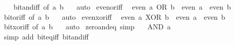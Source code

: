 \begin{isabellebody}
%
\isadelimproof
\ \ %
\endisadelimproof
%
\isatagproof
{}\isamarkupfalse%
\ bit{\isacharunderscore}{\kern0pt}and{\isacharunderscore}{\kern0pt}iff\ {\isacharbrackleft}{\kern0pt}of\ a\ b\ {}{\isacharbrackright}{\kern0pt}\ \isamarkupfalse%
\ auto%
\endisatagproof
{\isafoldproof}%
%
\isadelimproof
\isanewline
%
\endisadelimproof
\isanewline
{}\isamarkupfalse%
\ even{\isacharunderscore}{\kern0pt}or{\isacharunderscore}{\kern0pt}iff{\isacharcolon}{\kern0pt}\isanewline
\ \ {\isacartoucheopen}even\ {\isacharparenleft}{\kern0pt}a\ OR\ b{\isacharparenright}{\kern0pt}\ {\isasymlongleftrightarrow}\ even\ a\ {\isasymand}\ even\ b{\isacartoucheclose}\isanewline
%
\isadelimproof
\ \ %
\endisadelimproof
%
\isatagproof
{}\isamarkupfalse%
\ bit{\isacharunderscore}{\kern0pt}or{\isacharunderscore}{\kern0pt}iff\ {\isacharbrackleft}{\kern0pt}of\ a\ b\ {}{\isacharbrackright}{\kern0pt}\ \isamarkupfalse%
\ auto%
\endisatagproof
{\isafoldproof}%
%
\isadelimproof
\isanewline
%
\endisadelimproof
\isanewline
{}\isamarkupfalse%
\ even{\isacharunderscore}{\kern0pt}xor{\isacharunderscore}{\kern0pt}iff{\isacharcolon}{\kern0pt}\isanewline
\ \ {\isacartoucheopen}even\ {\isacharparenleft}{\kern0pt}a\ XOR\ b{\isacharparenright}{\kern0pt}\ {\isasymlongleftrightarrow}\ {\isacharparenleft}{\kern0pt}even\ a\ {\isasymlongleftrightarrow}\ even\ b{\isacharparenright}{\kern0pt}{\isacartoucheclose}\isanewline
%
\isadelimproof
\ \ %
\endisadelimproof
%
\isatagproof
{}\isamarkupfalse%
\ bit{\isacharunderscore}{\kern0pt}xor{\isacharunderscore}{\kern0pt}iff\ {\isacharbrackleft}{\kern0pt}of\ a\ b\ {}{\isacharbrackright}{\kern0pt}\ \isamarkupfalse%
\ auto%
\endisatagproof
{\isafoldproof}%
%
\isadelimproof
\isanewline
%
\endisadelimproof
\isanewline
{}\isamarkupfalse%
\ zero{\isacharunderscore}{\kern0pt}and{\isacharunderscore}{\kern0pt}eq\ {\isacharbrackleft}{\kern0pt}simp{\isacharbrackright}{\kern0pt}{\isacharcolon}{\kern0pt}\isanewline
\ \ {\isacartoucheopen}{}\ AND\ a\ {\isacharequal}{\kern0pt}\ {}{\isacartoucheclose}\isanewline
%
\isadelimproof
\ \ %
\endisadelimproof
%
\isatagproof
{}\isamarkupfalse%
\ {\isacharparenleft}{\kern0pt}simp\ add{\isacharcolon}{\kern0pt}\ bit{\isacharunderscore}{\kern0pt}eq{\isacharunderscore}{\kern0pt}iff\ bit{\isacharunderscore}{\kern0pt}and{\isacharunderscore}{\kern0pt}iff{\isacharparenright}{\kern0pt}%
\endisatagproof
{\isafoldproof}%
%
\isadelimproof
\isanewline

\end{isabellebody}
